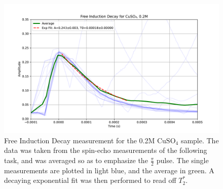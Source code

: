 \documentclass[12pt]{article}
\begin{document}
\begin{figure}[H]
  \includegraphics[scale = 0.5]{Free_Induction_Decay_0.2M.pdf}
  \caption{Free Induction Decay measurement for the 0.2M $\text{CuSO}_4$ sample. The data was taken from the spin-echo measurements of the following task, and was averaged so as to emphasize the $\frac{\pi}{2}$ pulse. The single measurements are plotted in light blue, and the average in green. A decaying exponential fit was then performed to read off $T_2^*$.}
  \label{Free_Induction_Decay_0.2M.pdf}
\end{figure}
%
\end{document}
